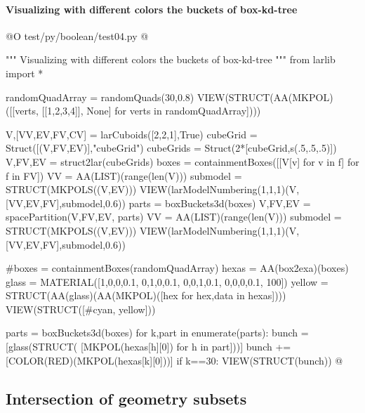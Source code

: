 \documentclass[11pt,oneside]{article}    %
\begin{document}
\paragraph{Visualizing with different colors the buckets of box-kd-tree}
@O test/py/boolean/test04.py @{
""" Visualizing with different colors the buckets of box-kd-tree """
from larlib import *

randomQuadArray = randomQuads(30,0.8)
VIEW(STRUCT(AA(MKPOL)([[verts, [[1,2,3,4]], None] for verts in randomQuadArray])))

V,[VV,EV,FV,CV] = larCuboids([2,2,1],True)
cubeGrid = Struct([(V,FV,EV)],"cubeGrid")
cubeGrids = Struct(2*[cubeGrid,s(.5,.5,.5)])
V,FV,EV = struct2lar(cubeGrids)
boxes = containmentBoxes([[V[v] for v in f] for f in FV])
VV = AA(LIST)(range(len(V)))
submodel = STRUCT(MKPOLS((V,EV)))
VIEW(larModelNumbering(1,1,1)(V,[VV,EV,FV],submodel,0.6)) 
parts = boxBuckets3d(boxes)
V,FV,EV = spacePartition(V,FV,EV, parts)
VV = AA(LIST)(range(len(V)))
submodel = STRUCT(MKPOLS((V,EV)))
VIEW(larModelNumbering(1,1,1)(V,[VV,EV,FV],submodel,0.6)) 


#boxes = containmentBoxes(randomQuadArray)
hexas = AA(box2exa)(boxes)
glass = MATERIAL([1,0,0,0.1,  0,1,0,0.1,  0,0,1,0.1, 0,0,0,0.1, 100])
yellow = STRUCT(AA(glass)(AA(MKPOL)([hex for hex,data in hexas])))
VIEW(STRUCT([#cyan,
    yellow]))

parts = boxBuckets3d(boxes)
for k,part in enumerate(parts):
    bunch = [glass(STRUCT( [MKPOL(hexas[h][0]) for h in part]))]
    bunch += [COLOR(RED)(MKPOL(hexas[k][0]))]
    if k==30: VIEW(STRUCT(bunch))
@}


\subsection{Intersection of geometry subsets}
\end{document}

